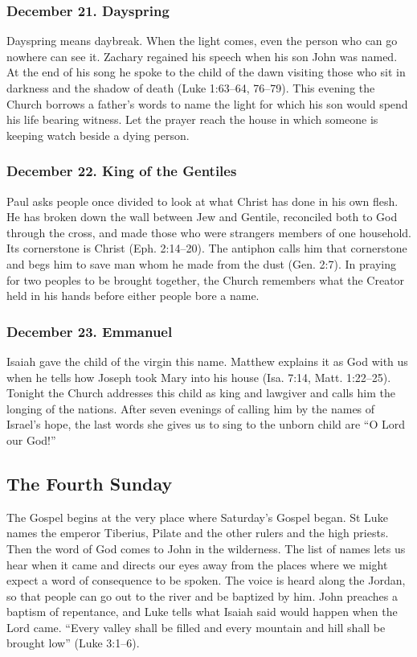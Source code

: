 \subsubsection*{December 21. Dayspring}

Dayspring means daybreak. When the light comes, even the person who
can go nowhere can see it. Zachary regained his speech when his son
John was named. At the end of his song he spoke to the child of the
dawn visiting those who sit in darkness and the shadow of death
(Luke 1:63--64, 76--79). This evening the Church borrows a father's
words to name the light for which his son would spend his life bearing
witness. Let the prayer reach the house in which someone is keeping
watch beside a dying person.

\subsubsection*{December 22. King of the Gentiles}

Paul asks people once divided to look at what Christ has done in
his own flesh. He has broken down the wall between Jew and Gentile,
reconciled both to God through the cross, and made those who were
strangers members of one household. Its cornerstone is Christ
(Eph. 2:14--20). The antiphon calls him that cornerstone and begs
him to save man whom he made from the dust (Gen. 2:7). In praying
for two peoples to be brought together, the Church remembers what
the Creator held in his hands before either people bore a name.

\subsubsection*{December 23. Emmanuel}

Isaiah gave the child of the virgin this name. Matthew explains it
as God with us when he tells how Joseph took Mary into his house
(Isa. 7:14, Matt. 1:22--25). Tonight the Church addresses this child
as king and lawgiver and calls him the longing of the nations. After
seven evenings of calling him by the names of Israel's hope, the last
words she gives us to sing to the unborn child are “O Lord our God!”

\subsection{The Fourth Sunday}

The Gospel begins at the very place where Saturday's Gospel began.
St Luke names the emperor Tiberius, Pilate and the other
rulers and the high priests. Then the word of God comes to John in the
wilderness. The list of names lets us hear when it came and directs our
eyes away from the places where we might expect a word of consequence
to be spoken. The voice is heard along the Jordan, so that people can
go out to the river and be baptized by him. John preaches a baptism of
repentance, and Luke tells what Isaiah said would happen when the Lord
came. “Every valley shall be filled and every mountain and hill shall
be brought low” (Luke 3:1--6).

